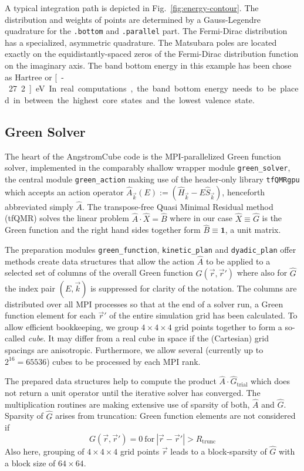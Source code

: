 \documentclass[oribibl]{llncs}
\newcommand{\um}[1]{_{\mathrm{#1}}}
\newcommand{\ttt}[1]{\texttt{#1}}
\newcommand{\fullcodename}{AngstromCube}
\begin{document}
\noindent
A typical integration path is depicted in Fig.~\ref{fig:energy-contour}. 
The distribution and weights of points are determined by a Gauss-Legendre quadrature for the \ttt{.bottom} and \ttt{.parallel} part.
The Fermi-Dirac distribution has a specialized, asymmetric quadrature.
The Matsubara poles are located exactly on the equidistantly-spaced zeros of the Fermi-Dirac distribution function on the imaginary axis.
The band bottom energy in this example has been chose as \unit[-1]{Hartree} or \unit[-27.2]{eV}.
In real computations, the band bottom energy needs to be placed in between the highest core states and the lowest valence state.

\subsection{Green Solver}\label{sec:green-solver}
The heart of the \fullcodename{} code is the \ac{MPI}-parallelized Green function solver,
implemented in the comparably shallow wrapper module \ttt{green\_solver}, 
the central module \ttt{green\_action} making use of the header-only library \ttt{tfQMRgpu} \cite{Baumeister2025}
which accepts an action operator $\hat A_{\vec k}(E) := (\hat H_{\vec k} - E\hat S_{\vec k})$, henceforth abbreviated simply $\hat A$.
The transpose-free Quasi Minimal Residual method (tfQMR) solves the linear problem $\hat A \cdot \hat X = \hat B$ where in our case $\hat X \equiv \hat G$ is the Green function and the right hand sides together form $\hat B \equiv \mathbf{1}$, a unit matrix.

\noindent
The preparation modules \ttt{green\_function}, \ttt{kinetic\_plan} and \ttt{dyadic\_plan} offer methods create data structures that allow the action $\hat A$ to be applied to a selected set of columns of the overall Green function $\hat G(\vec r, \vec r')$ where also for $\hat G$ the index pair $(E,\vec k)$ is suppressed for clarity of the notation.
The columns are distributed over all \ac{MPI} processes so that at the end of a solver run, a Green function element for each $\vec r'$ of the entire simulation grid has been calculated.
To allow efficient bookkeeping, we group $4 \times 4 \times 4$ grid points together to form a so-called \emph{cube}.
It may differ from a real cube in space if the (Cartesian) grid spacings are anisotropic.
Furthermore, we allow several (currently up to $2^{16}=65536$) cubes to be processed by each \ac{MPI} rank.

The prepared data structures help to compute the product $\hat A \cdot \hat G\um{trial}$ which does not return a unit operator until the iterative solver has converged. The multiplication routines are making extensive use of sparsity of both, $\hat A$ and $\hat G$. Sparsity of $\hat G$ arises from truncation: Green function elements are not considered if 
\begin{equation}
	G(\vec r,\vec r') = 0 \  \text{for} \  |\vec r - \vec r'| > R\um{trunc}
\end{equation}
Also here, grouping of $4 \times 4 \times 4$ grid points $\vec r$ leads to a block-sparsity of $\hat G$ with a block size of $64 \times 64$.
\end{document}
